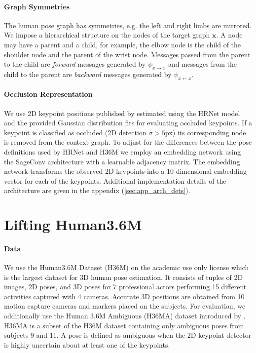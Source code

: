 \documentclass{article} \usepackage{iclr2023_conference,times}
\def\vx{{\bm{x}}}
\begin{document}
    \paragraph{Graph Symmetries}
    The human pose graph has symmetries, e.g. the left and right limbs are mirrored.
    We impose a hierarchical structure on the nodes of the target graph $\vx$.
    A node may have a parent and a child, for example, the elbow node is the child of the shoulder node and the parent of the wrist node.
    Messages passed from the parent to the child are \textit{forward} messages generated by $\psi_{x\rightarrow x}$ and messages from the child to the parent are \textit{backward} messages generated by $\psi_{x\leftarrow x}$.

    \paragraph{Occlusion Representation}
    We use 2D keypoint positions published by \citet{Wehrbein_Rudolph_Rosenhahn_Wandt_2021} estimated using the HRNet model \citep{sun2019deep} and the provided Gaussian distribution fits for evaluating occluded keypoints.
    If a keypoint is classified as occluded (2D detection $\sigma > 5$px) its corresponding node is removed from the context graph.
    To adjust for the differences between the pose definitions used by HRNet and H36M we employ an embedding network using the SageConv architecture \citep{hamilton_ying_leskovec} with a learnable adjacency matrix.
    The embedding network transforms the observed 2D keypoints into a 10-dimensional embedding vector for each of the keypoints. Additional implementation details of the architecture are given in the appendix (\ref{sec:app_arch_dets}).

\section{Lifting Human3.6M}
\label{sec:lifting}

\paragraph{Data} We use the Human3.6M Dataset (H36M) on the academic use only license \citep{IonescuSminchisescu11, h36m_pami} which is the largest dataset for 3D human pose estimation.
It consists of tuples of 2D images, 2D poses, and 3D poses for 7 professional actors performing 15 different activities captured with 4 cameras.
Accurate 3D positions are obtained from 10 motion capture cameras and markers placed on the subjects.
For evaluation, we additionally use the Human 3.6M Ambiguous (H36MA) dataset introduced by \citet{Wehrbein_Rudolph_Rosenhahn_Wandt_2021}.
H36MA is a subset of the H36M dataset containing only ambiguous poses from subjects 9 and 11.
A pose is defined as ambiguous when the 2D keypoint detector is highly uncertain about at least one of the keypoints.
\end{document}
